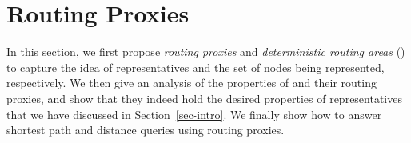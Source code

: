 \section{Routing Proxies}
\label{sec-proxy}



In this section, we first propose {\em routing  proxies} and {\em deterministic routing areas} (\dras) to capture the idea of representatives and the set of
nodes being represented, respectively. We then give an analysis of the properties of  \dras and their routing proxies, and show that they indeed hold the desired properties of representatives that we have discussed in Section~\ref{sec-intro}.
We finally show how to answer shortest path and distance queries using routing proxies.








